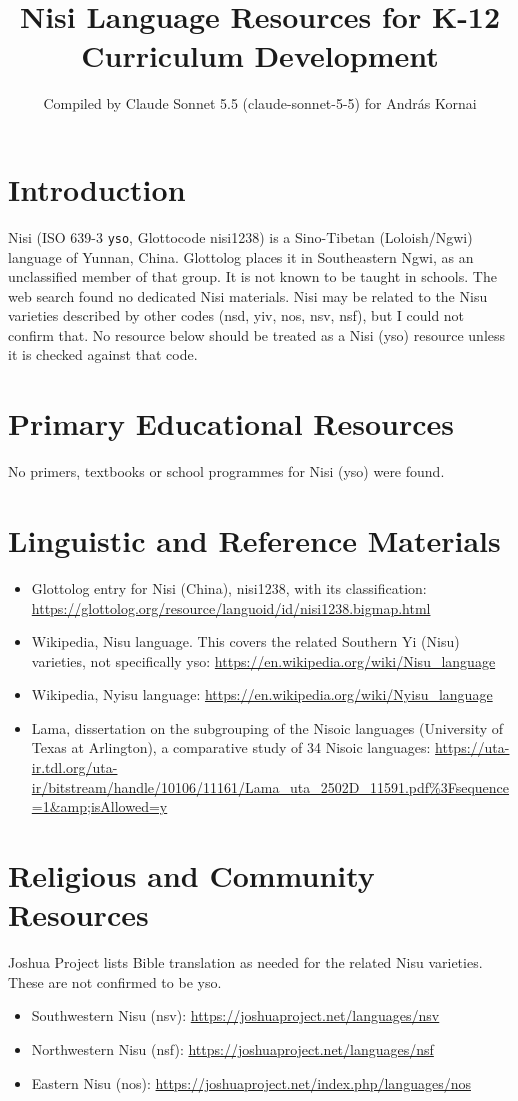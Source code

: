 \documentclass[12pt]{article}
\title{Nisi Language Resources for K-12 Curriculum Development}
\author{Compiled by Claude Sonnet 5.5 (claude-sonnet-5-5) for Andr\'as Kornai}
\date{}
\begin{document}
\maketitle

\section{Introduction}
Nisi (ISO 639-3 \texttt{yso}, Glottocode nisi1238) is a Sino-Tibetan (Loloish/Ngwi) language of Yunnan, China. Glottolog places it in Southeastern Ngwi, as an unclassified member of that group. It is not known to be taught in schools. The web search found no dedicated Nisi materials. Nisi may be related to the Nisu varieties described by other codes (nsd, yiv, nos, nsv, nsf), but I could not confirm that. No resource below should be treated as a Nisi (yso) resource unless it is checked against that code.

\section{Primary Educational Resources}
No primers, textbooks or school programmes for Nisi (yso) were found.

\section{Linguistic and Reference Materials}
\begin{itemize}
\item Glottolog entry for Nisi (China), nisi1238, with its classification: \url{https://glottolog.org/resource/languoid/id/nisi1238.bigmap.html}
\item Wikipedia, Nisu language. This covers the related Southern Yi (Nisu) varieties, not specifically yso: \url{https://en.wikipedia.org/wiki/Nisu_language}
\item Wikipedia, Nyisu language: \url{https://en.wikipedia.org/wiki/Nyisu_language}
\item Lama, dissertation on the subgrouping of the Nisoic languages (University of Texas at Arlington), a comparative study of 34 Nisoic languages: \url{https://uta-ir.tdl.org/uta-ir/bitstream/handle/10106/11161/Lama_uta_2502D_11591.pdf%3Fsequence=1&amp;isAllowed=y}
\end{itemize}

\section{Religious and Community Resources}
Joshua Project lists Bible translation as needed for the related Nisu varieties. These are not confirmed to be yso.
\begin{itemize}
\item Southwestern Nisu (nsv): \url{https://joshuaproject.net/languages/nsv}
\item Northwestern Nisu (nsf): \url{https://joshuaproject.net/languages/nsf}
\item Eastern Nisu (nos): \url{https://joshuaproject.net/index.php/languages/nos}
\end{itemize}
\end{document}
